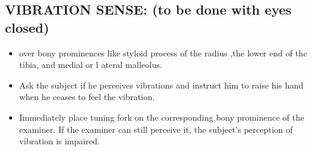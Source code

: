 \documentclass[a4paper,12pt]{book}
\begin{document}
\subsection*{VIBRATION SENSE: (to be done with eyes closed)}
\begin{itemize}
\item{over bony prominences like styloid process of the radius ,the lower end of the tibia, and medial or l ateral malleolus.}
\item{Ask the subject if he perceives vibrations and instruct him to raise his hand when he ceases to feel the vibration.}
\item{Immediately place tuning fork on the corresponding bony prominence of the examiner. If the examiner can still perceive it, the subject's perception of vibration is impaired.}
\end{itemize}
\end{document}
